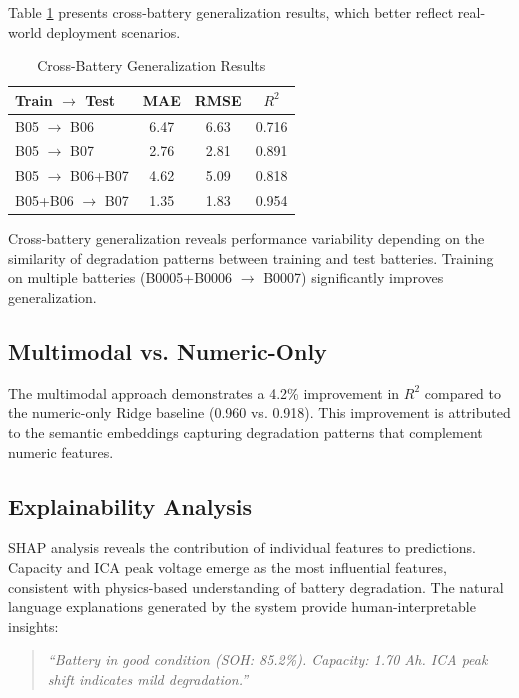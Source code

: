 \documentclass[conference]{IEEEtran}
\begin{document}
Table \ref{tab:crossbattery} presents cross-battery generalization results, which better reflect real-world deployment scenarios.

\begin{table}[htbp]
\caption{Cross-Battery Generalization Results}
\label{tab:crossbattery}
\centering
\small
\begin{tabular}{lccc}
\toprule
\textbf{Train $\rightarrow$ Test} & \textbf{MAE} & \textbf{RMSE} & \textbf{$R^2$} \\
\midrule
B05 $\rightarrow$ B06 & 6.47 & 6.63 & 0.716 \\
B05 $\rightarrow$ B07 & 2.76 & 2.81 & 0.891 \\
B05 $\rightarrow$ B06+B07 & 4.62 & 5.09 & 0.818 \\
B05+B06 $\rightarrow$ B07 & 1.35 & 1.83 & 0.954 \\
\bottomrule
\end{tabular}
\end{table}

Cross-battery generalization reveals performance variability depending on the similarity of degradation patterns between training and test batteries. Training on multiple batteries (B0005+B0006 $\rightarrow$ B0007) significantly improves generalization.

\subsection{Multimodal vs. Numeric-Only}

The multimodal approach demonstrates a 4.2\% improvement in $R^2$ compared to the numeric-only Ridge baseline (0.960 vs. 0.918). This improvement is attributed to the semantic embeddings capturing degradation patterns that complement numeric features.

\subsection{Explainability Analysis}

SHAP analysis reveals the contribution of individual features to predictions. Capacity and ICA peak voltage emerge as the most influential features, consistent with physics-based understanding of battery degradation. The natural language explanations generated by the system provide human-interpretable insights:

\begin{quote}
\textit{``Battery in good condition (SOH: 85.2\%). Capacity: 1.70 Ah. ICA peak shift indicates mild degradation.''}
\end{quote}
\end{document}
